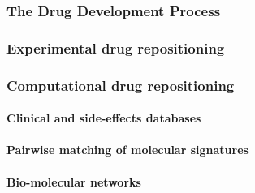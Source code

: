 \subsubsection{The Drug Development Process}

\subsubsection{Experimental drug repositioning}

\subsubsection{Computational drug repositioning}

\paragraph{Clinical and side-effects databases}

\paragraph{Pairwise matching of molecular signatures}

\paragraph{Bio-molecular networks}











